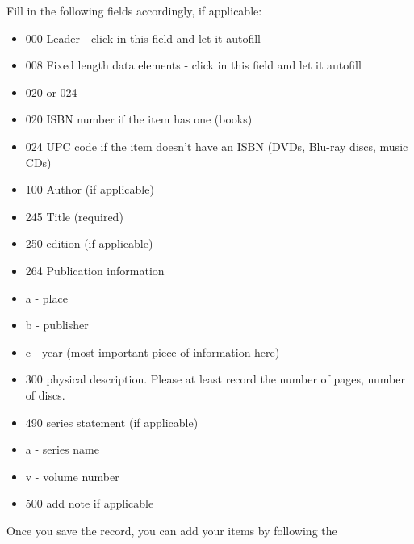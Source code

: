 \documentclass[letterpaper,10pt,english]{sphinxmanual}
\begin{document}
Fill in the following fields accordingly, if applicable:
\begin{itemize}
\item {} 
000 \textendash{} Leader - click in this field and let it autofill

\item {} 
008 \textendash{} Fixed length data elements - click in this field and let it
autofill

\item {} 
020 or 024

\item {} 
020 \textendash{} ISBN number if the item has one (books)

\item {} 
024 \textendash{} UPC code if the item doesn’t have an ISBN (DVDs, Blu-ray
discs, music CDs)

\item {} 
100 \textendash{} Author (if applicable)

\item {} 
245 \textendash{} Title (required)

\item {} 
250 \textendash{} edition (if applicable)

\item {} 
264 \textendash{} Publication information

\item {} 
a - place

\item {} 
b - publisher

\item {} 
c - year (most important piece of information here)

\item {} 
300 \textendash{} physical description. Please at least record the number of
pages, number of discs.

\item {} 
490 \textendash{} series statement (if applicable)

\item {} 
a - series name

\item {} 
v - volume number

\item {} 
500 \textendash{} add note if applicable

\end{itemize}

Once you save the record, you can add your items by following the
\end{document}
